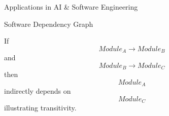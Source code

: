 
\begin{frame}{Applications in AI \& Software Engineering}

\begin{block}{Software Dependency Graph}

\vspace{0.1cm}

If
\[
Module_A
\rightarrow
Module_B
\]
and
\[
Module_B
\rightarrow
Module_C
\]
then
\[
Module_A
\]
indirectly depends on
\[
Module_C
\]
illustrating transitivity.

\end{block}

\end{frame}